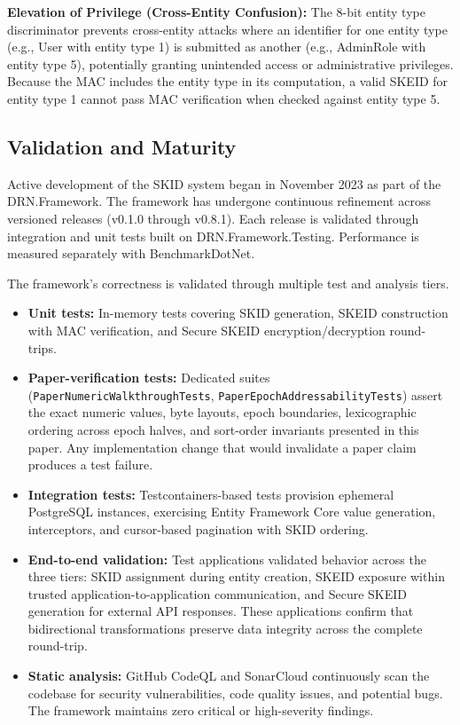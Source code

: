 \documentclass[fleqn,10pt,lineno]{wlpeerj}
\providecommand{\tightlist}{%
  \setlength{\itemsep}{0pt}\setlength{\parskip}{0pt}}
\begin{document}
\textbf{Elevation of Privilege (Cross-Entity Confusion):} The 8-bit
entity type discriminator prevents cross-entity attacks where an
identifier for one entity type (e.g., User with entity type 1) is
submitted as another (e.g., AdminRole with entity type 5), potentially
granting unintended access or administrative privileges. Because the MAC
includes the entity type in its computation, a valid SKEID for entity
type 1 cannot pass MAC verification when checked against entity type 5.

\subsection{Validation and Maturity}\label{validation-and-maturity}

Active development of the SKID system began in November 2023 as part of
the DRN.Framework. The framework has undergone continuous refinement
across versioned releases (v0.1.0 through v0.8.1). Each release is
validated through integration and unit tests built on
DRN.Framework.Testing. Performance is measured separately with
BenchmarkDotNet.

The framework's correctness is validated through multiple test and
analysis tiers.

\begin{itemize}
\tightlist
\item
  \textbf{Unit tests:} In-memory tests covering SKID generation, SKEID
  construction with MAC verification, and Secure SKEID
  encryption/decryption round-trips.
\item
  \textbf{Paper-verification tests:} Dedicated suites
  (\texttt{PaperNumericWalkthroughTests},
  \texttt{PaperEpochAddressabilityTests}) assert the exact numeric
  values, byte layouts, epoch boundaries, lexicographic ordering across
  epoch halves, and sort-order invariants presented in this paper. Any
  implementation change that would invalidate a paper claim produces a
  test failure.
\item
  \textbf{Integration tests:} Testcontainers-based tests provision
  ephemeral PostgreSQL instances, exercising Entity Framework Core value
  generation, interceptors, and cursor-based pagination with SKID
  ordering.
\item
  \textbf{End-to-end validation:} Test applications validated behavior
  across the three tiers: SKID assignment during entity creation, SKEID
  exposure within trusted application-to-application communication, and
  Secure SKEID generation for external API responses. These applications
  confirm that bidirectional transformations preserve data integrity
  across the complete round-trip.
\item
  \textbf{Static analysis:} GitHub CodeQL and SonarCloud continuously
  scan the codebase for security vulnerabilities, code quality issues,
  and potential bugs. The framework maintains zero critical or
  high-severity findings.
\end{itemize}
\end{document}
